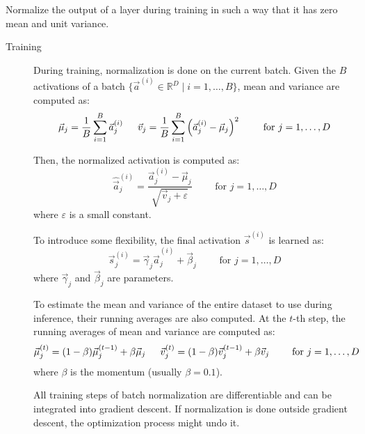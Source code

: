 Normalize the output of a layer during training in such a way that it has zero mean and unit variance.

\begin{description}
    \item[Training]
        During training, normalization is done on the current batch.
        Given the $B$ activations of a batch $\{ \vec{a}^{(i)} \in \mathbb{R}^{D} \mid i = 1, \dots, B \}$, 
        mean and variance are computed as:
        \[ 
            \vec{\mu}_j = \frac{1}{B} \sum_{i=1}^{B} \vec{a}_j^{(i)} 
            \hspace{1.5em} 
            \vec{v}_j = \frac{1}{B} \sum_{i=1}^{B} \left( \vec{a}_j^{(i)} - \vec{\mu}_j \right)^2 
            \hspace{2em}
            \text{ for $j = 1, \dots, D$} 
        \]

        Then, the normalized activation is computed as:
        \[ \hat{\vec{a}}_j^{(i)} = \frac{\vec{a}_j^{(i)} - \vec{\mu}_j}{\sqrt{\vec{v}_j + \varepsilon}} \hspace{2em} \text{ for $j = 1, \dots, D$} \]
        where $\varepsilon$ is a small constant.

        To introduce some flexibility, the final activation $\vec{s}^{(i)}$ is learned as:
        \[ \vec{s}_j^{(i)} = \vec{\gamma}_j \hat{\vec{a}}_j^{(i)} + \vec{\beta}_j \hspace{2em} \text{ for $j = 1, \dots, D$} \]
        where $\vec{\gamma}_j$ and $\vec{\beta}_j$ are parameters.

        To estimate the mean and variance of the entire dataset to use during inference, their running averages are also computed.
        At the $t$-th step, the running averages of mean and variance are computed as:
        \[ 
            \vec{\mu}_j^{(t)} = (1-\beta) \vec{\mu}_j^{(t-1)} + \beta \vec{\mu}_j 
            \hspace{1.5em} 
            \vec{v}_j^{(t)} = (1-\beta) \vec{v}_j^{(t-1)} + \beta \vec{v}_j 
            \hspace{2em} \text{ for $j = 1, \dots, D$} 
        \]
        where $\beta$ is the momentum (usually $\beta = 0.1$).

        \begin{remark}
            All training steps of batch normalization are differentiable and can be integrated into gradient descent.
            If normalization is done outside gradient descent, the optimization process might undo it.
        \end{remark}


\end{description}
